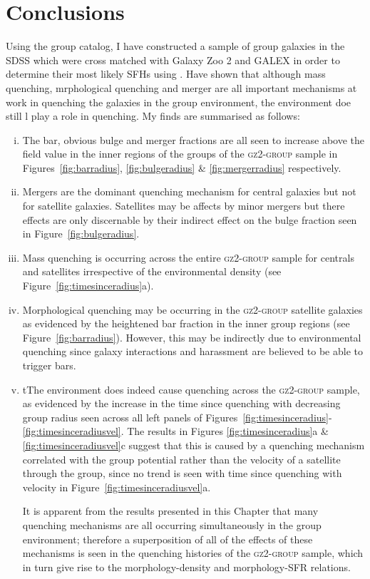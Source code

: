 \section{Conclusions}\label{sec:conc}

Using the \citet{berlind06} group catalog, I have constructed a sample of group galaxies in the SDSS which were cross matched with Galaxy Zoo 2 and GALEX in order to determine their most likely SFHs using \starpy. Have shown that although mass quenching, mrphological quenching and merger are all important mechanisms at work in quenching the galaxies in the group environment, the environment doe still l play a role in quenching. My finds are summarised as follows:
\begin{enumerate}[(i)]
\item The bar, obvious bulge and merger fractions are all seen to increase above the field value in the inner regions of the groups of the \textsc{gz2-group} sample in Figures~\ref{fig:barradius}, \ref{fig:bulgeradius} \& \ref{fig:mergerradius} respectively.  
 
\item Mergers are the dominant quenching mechanism for central galaxies but not for satellite galaxies. Satellites may be affects by minor mergers but there effects are only discernable by their indirect effect on the bulge fraction seen in Figure~\ref{fig:bulgeradius}.
 
 \item Mass quenching is occurring across the entire \textsc{gz2-group} sample for centrals and satellites irrespective of the environmental density (see Figure~\ref{fig:timesinceradius}a).
 
 \item Morphological quenching may be occurring in the \textsc{gz2-group} satellite galaxies as evidenced by the heightened bar fraction in the inner group regions (see Figure~\ref{fig:barradius}). However, this may be indirectly due to environmental quenching since galaxy interactions and harassment are believed to be able to trigger bars. 
 
 \item tThe environment does indeed cause quenching across the \textsc{gz2-group} sample, as evidenced by the increase in the time since quenching with decreasing group radius seen across all left panels of Figures~\ref{fig:timesinceradius}-\ref{fig:timesinceradiusvel}. The results in Figures \ref{fig:timesinceradius}a \&  \ref{fig:timesinceradiusvel}c suggest that this is caused by a quenching mechanism correlated with the group potential rather than the velocity of a satellite through the group, since no trend is seen with time since quenching with velocity in Figure~\ref{fig:timesinceradiusvel}a. 
 
 It is apparent from the results presented in this Chapter that many quenching mechanisms are all occurring simultaneously in the group environment; therefore a superposition of all of the effects of these mechanisms is seen in the quenching histories of the \textsc{gz2-group} sample, which in turn give rise to the morphology-density and morphology-SFR relations. 
 
  
\end{enumerate}
